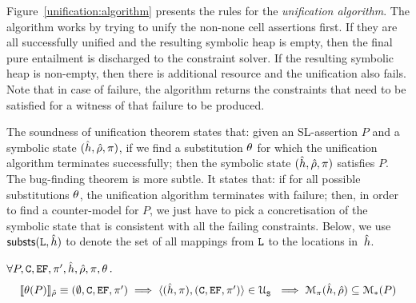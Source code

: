 
Figure~\ref{unification:algorithm} presents the rules for the \emph{unification algorithm}. 
The algorithm works by trying to unify the non-none cell assertions first. If they are all 
successfully unified and the resulting symbolic heap is empty, then the final pure entailment 
is discharged to the constraint solver. If the resulting symbolic heap is non-empty, then there 
is additional resource and the unification also fails. Note that in case of failure, the algorithm 
returns the constraints that need to be satisfied for a witness of that failure to be produced. 




The soundness of unification theorem states that: given an SL-assertion $P$ and a 
symbolic state $(\hat{h}, \hat\rho, \pi)$, if we find a substitution $\theta$ 
for which the unification algorithm terminates successfully; then the symbolic state
$(\hat{h}, \hat\rho, \pi)$ satisfies $P$. 
The bug-finding theorem is more subtle. It states that: if for all possible substitutions 
$\theta$, the unification algorithm terminates with failure; then, in order to find a counter-model 
for $P$, we just have to pick a concretisation of the symbolic state that is consistent with all 
the failing constraints. Below, we use ${\sf substs}(\mathtt{L}, \hat{h})$ to denote 
the set of all mappings from $\mathtt{L}$ to the locations in~$\hat{h}$. 

\begin{theorem}\label{teo:unification:soundness}
$\forall P, \mathtt{C}, \mathtt{EF}, \pi',  \hat{h}, \hat\rho, \pi, \theta \, .$
$$
\begin{array}{l}
\llbracket \theta(P) \rrbracket_{\hat\rho} \equiv (\emptyset, \mathtt{C}, \mathtt{EF}, \pi')\implies\langle (\hat{h}, \pi), (\mathtt{C}, \mathtt{EF}, \pi') \rangle \in {\cal U}_{\mathtt{S}}^{} \
    \implies \mathcal{M}_{\pi}(\hat{h}, \hat\rho) \subseteq \mathcal{M}_{*}(P)   
\end{array}
$$ 
\end{theorem}

%




